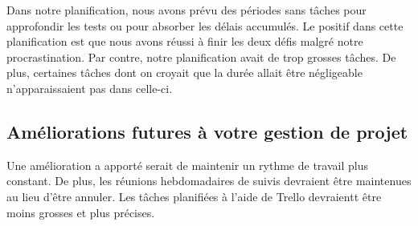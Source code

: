 \begin{spacing}{1.5}
    Dans notre planification, nous avons prévu des périodes sans tâches pour approfondir les tests ou pour absorber les délais accumulés.
    Le positif dans cette planification est que nous avons réussi à finir les deux défis malgré notre procrastination.
    Par contre, notre planification avait de trop grosses tâches.
    De plus, certaines tâches dont on croyait que la durée allait être négligeable n'apparaissaient pas dans celle-ci.
\end{spacing}

\subsection{Améliorations futures à votre gestion de projet}

\begin{spacing}{1.5}
    Une amélioration a apporté serait de maintenir un rythme de travail plus constant.
    De plus, les réunions hebdomadaires de suivis devraient être maintenues au lieu d'être annuler.
    Les tâches planifiées à l'aide de Trello devraientt être moins grosses et plus précises.
\end{spacing}
